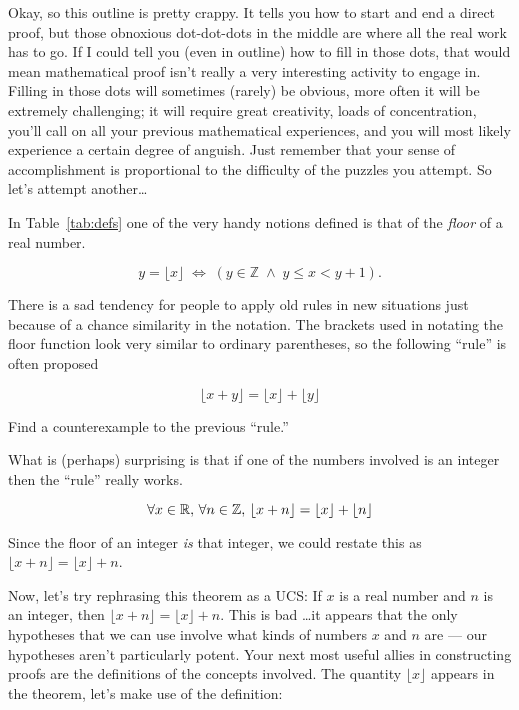Okay, so this outline is pretty crappy.  It tells you how to start and 
end a direct proof, but those obnoxious dot-dot-dots in the middle are 
where all the real work has to go.  If I could tell you (even in outline) 
how to fill in those dots, that would mean mathematical proof isn't really 
a very interesting activity to engage in.  Filling in those dots will 
sometimes (rarely) be obvious, more often it will be extremely challenging; 
it will require great creativity, loads of concentration, you'll call on 
all your previous mathematical experiences, and you will most likely
experience a certain degree of anguish.  Just remember that your sense 
of accomplishment is proportional to the difficulty of the puzzles you 
attempt.  So let's attempt another\ldots

In Table~\ref{tab:defs} one of the very handy notions defined is that 
of the \emph{floor} of a real number. 

\[ y = \lfloor x \rfloor \; \iff \; (y \in \mathbb Z \; \land \; y \leq x < y+1).\]

There is a sad tendency for people to apply old rules in new situations 
just because of a chance similarity in the notation.  The brackets used 
in notating the floor function look very similar to ordinary parentheses, 
so the following ``rule'' is often proposed

\[ \lfloor x + y \rfloor = \lfloor x \rfloor + \lfloor y \rfloor \]

\begin{exer} 
Find a counterexample to the previous ``rule.''
\end{exer}

What is (perhaps) surprising is that if one of the numbers involved is an
integer then the ``rule'' really works.

\begin{thm}
\[ \forall x \in {\mathbb R}, \, \forall n \in {\mathbb Z}, \, 
\lfloor x + n \rfloor = \lfloor x \rfloor + \lfloor n \rfloor \]
\end{thm}

Since the floor of an integer {\em is} that integer, we could restate this
as $ \lfloor x + n \rfloor = \lfloor x \rfloor +  n$. 

Now, let's try rephrasing this theorem as a UCS:  If $x$ is a real number
and $n$ is an integer, then $\lfloor x + n \rfloor = \lfloor x \rfloor +  n$.
This is bad \ldots it appears that the only hypotheses that we can use
involve what kinds of numbers $x$ and $n$ are --- our hypotheses aren't
particularly potent.  Your next most useful allies in constructing proofs
are the definitions of the concepts involved.  The quantity 
$\lfloor x \rfloor$ appears in the theorem, let's make
use of the definition:

